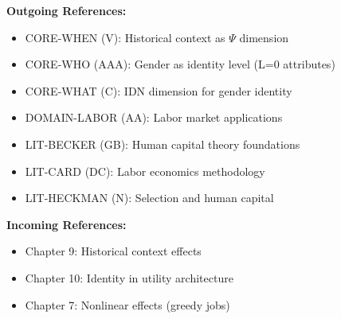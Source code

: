 \begin{tcolorbox}[colback=gray!5!white, colframe=gray!75!black, title=Cross-Reference Map]
\textbf{Outgoing References:}
\begin{itemize}[nosep]
    \item CORE-WHEN (V): Historical context as $\Psi$ dimension
    \item CORE-WHO (AAA): Gender as identity level (L=0 attributes)
    \item CORE-WHAT (C): IDN dimension for gender identity
    \item DOMAIN-LABOR (AA): Labor market applications
    \item LIT-BECKER (GB): Human capital theory foundations
    \item LIT-CARD (DC): Labor economics methodology
    \item LIT-HECKMAN (N): Selection and human capital
\end{itemize}

\textbf{Incoming References:}
\begin{itemize}[nosep]
    \item Chapter 9: Historical context effects
    \item Chapter 10: Identity in utility architecture
    \item Chapter 7: Nonlinear effects (greedy jobs)
\end{itemize}
\end{tcolorbox}


